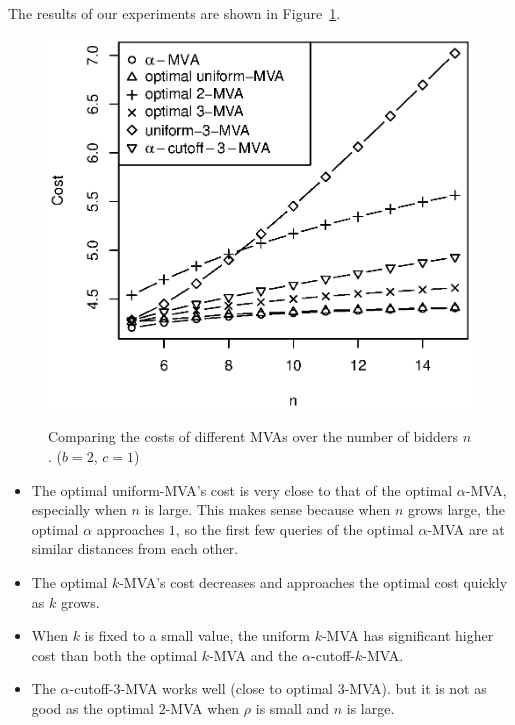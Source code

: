 The results of our experiments are shown in Figure~\ref{fig:cost_comparisons}.
\begin{figure}
\centering
    \includegraphics[trim=0 5mm 5mm 15mm, clip, width=.65\linewidth]{figures/analyze_cost_2_5_15.eps}
    \label{fig:cost_comparison_2}
    \caption{Comparing the costs of different MVAs over the number of bidders $n$. ($b = 2$, $c=1$)}
    \label{fig:cost_comparisons}
\end{figure}
\begin{itemize}
\item 
The optimal uniform-MVA's cost is very close to that of the optimal $\alpha$-MVA,
especially when $n$ is large. This makes sense because when $n$ grows
large, the optimal $\alpha$ approaches $1$, so the first few queries of
the optimal $\alpha$-MVA are at similar distances from each other.
%
\item The optimal $k$-MVA's cost decreases and approaches the optimal cost quickly
as $k$ grows.
\item When $k$ is fixed to a small value, 
the uniform $k$-MVA  has significant higher cost than both the optimal
$k$-MVA and the $\alpha$-cutoff-$k$-MVA.
\item The $\alpha$-cutoff-$3$-MVA works well (close to optimal $3$-MVA).
but it is not
as good as  the optimal $2$-MVA when $\rho$ is small and $n$ is large. 
\end{itemize}
